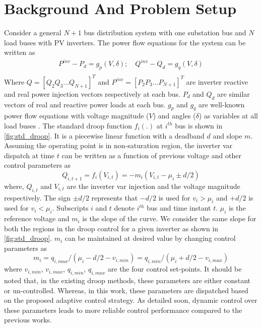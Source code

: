 \documentclass[journal]{IEEEtran}
\begin{document}
\section{Background And Problem Setup }
Consider a general $N+1$ bus distribution system with one substation bus and $N$ load buses with PV inverters. The power flow equations for the system can be written as
\begin{equation}
\label{eq:power_flow}
\begin{split}
P^{inv}-P_d= g_p(V,\delta); \quad Q^{inv}-Q_d= g_q(V,\delta)\\
\end{split}
\end{equation}
Where %
$Q\!=\![Q_2 Q_3 \dots Q_{N+1}]^T$ and $P^{inv}\!=\![P_2 P_3 \dots P_{N+1}]^T$ are inverter reactive and real power injection vectors respectively at each bus. $P_d$ and $Q_d$ are similar vectors of real and reactive power loads at each bus. $g_p$ and $g_q$ are well-known power flow equations with voltage magnitude ($V$) and angles ($\delta$) as variables at all load buses \cite{grainger_power_1994}. 
The standard droop function $f_i (.)$ at $i^{th}$ bus is shown in \figurename\ref{fig:std_droop}. It is a piecewise linear function with a deadband $d$ and slope $m$. Assuming the operating point is in non-saturation region, the inverter var dispatch at time $t$ can be written as a function of previous voltage and other control parameters as
\begin{equation}
\label{eq:droop}
{{Q}_{i,{t+1}}}=f_i(V_{i,t})=-m_i({{V}_{i,t}}-\mu_i \pm d/2)
\end{equation}
where, $Q_{i,t}$ and $V_{i,t}$ are the inverter var injection and the voltage magnitude respectively. The sign $\pm d/2$ represents that $-d/2$ is used for $v_i>\mu_i$ and $+d/2$ is used for $v_i<\mu_i$. Subscripts  $i$ and $t$ denote $i^{th}$ bus and time instant $t$. $\mu_i$ is the reference voltage and $m_i$ is the slope of the curve.  We consider the same slope for both the regions in the droop control for a given inverter as shown in \figurename \ref{fig:std_droop}. $m_i$ can be maintained at desired value by changing control parameters as
\begin{equation*}
\label{eq:slope}
m_i=q_{i,max}/(\mu_i-d/2-v_{i,min})= q_{i,min}/(\mu_i+d/2-v_{i,max})
\end{equation*}
where $v_{i,min}$, $v_{i,max}$, $q_{i,min}$, $q_{i,max}$ are the four control set-points. It should be noted that, in the existing droop methods, these parameters are either constant or un-controlled. Whereas, in this work, these parameters are dispatched based on the proposed adaptive control strategy. As detailed soon, dynamic control over these parameters leads to more reliable control performance compared to the previous works.
\end{document}
